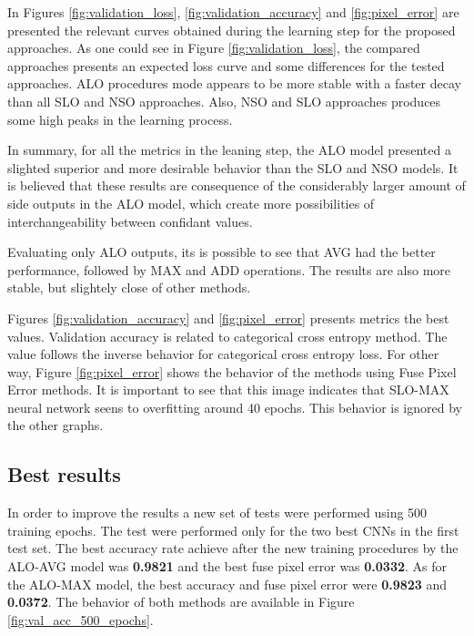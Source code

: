 In Figures \ref{fig:validation_loss}, \ref{fig:validation_accuracy} and \ref{fig:pixel_error} are presented the relevant curves obtained during the learning step for the proposed approaches. As one could see in Figure \ref{fig:validation_loss}, the compared approaches presents an expected loss curve and some differences for the tested approaches. ALO procedures mode appears to be more stable with a faster decay than all SLO and NSO approaches. Also, NSO and SLO approaches produces some high peaks in the learning process.

In summary, for all the metrics in the leaning step, the ALO model presented a slighted superior and more desirable behavior than the SLO and NSO models. It is believed that these results are consequence of the considerably larger amount of side outputs in the ALO model, which create more possibilities of interchangeability between confidant values.

Evaluating only ALO outputs, its is possible to see that AVG had the better performance, followed by MAX and ADD operations. The results are also more stable, but slightely close of other methods.

Figures \ref{fig:validation_accuracy} and \ref{fig:pixel_error} presents metrics the best values. Validation accuracy is related to categorical cross entropy method. The value follows the inverse behavior for categorical cross entropy loss. For other way, Figure \ref{fig:pixel_error} shows the behavior of the methods using Fuse Pixel Error methods. It is important to see that this image indicates that SLO-MAX neural network seens to overfitting around 40 epochs. This behavior is ignored by the other graphs. 

\subsection{Best results}

In order to improve the results a new set of tests were performed using 500 training epochs. The test were performed only for the two best CNNs in the first test set. The best accuracy rate achieve after the new training procedures by the ALO-AVG model was \textbf{0.9821} and the best fuse pixel error was \textbf{0.0332}. As for the ALO-MAX model, the best accuracy and fuse pixel error were \textbf{0.9823} and \textbf{0.0372}. The behavior of both methods are available in Figure \ref{fig:val_acc_500_epochs}.

